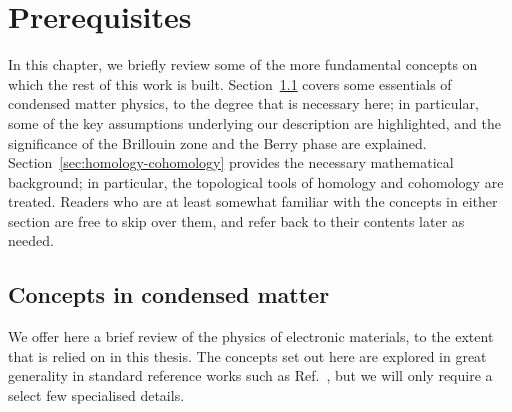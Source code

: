 \chapter{Prerequisites}\label{chap:prerequisites}

In this chapter, we briefly review some of the more fundamental concepts on which the rest of this work is built. Section~\ref{sec:band-theory} covers some essentials of condensed matter physics, to the degree that is necessary here; in particular, some of the key assumptions underlying our description are highlighted, and the significance of the Brillouin zone and the Berry phase are explained. Section~\ref{sec:homology-cohomology} provides the necessary mathematical background; in particular, the topological tools of homology and cohomology are treated. Readers who are at least somewhat familiar with the concepts in either section are free to skip over them, and refer back to their contents later as needed.

\section{Concepts in condensed matter}\label{sec:band-theory}

We offer here a brief review of the physics of electronic materials, to the extent that is relied on in this thesis. The concepts set out here are explored in great generality in standard reference works such as Ref.~\cite{AshcroftMermin_bands}, but we will only require a select few specialised details.

